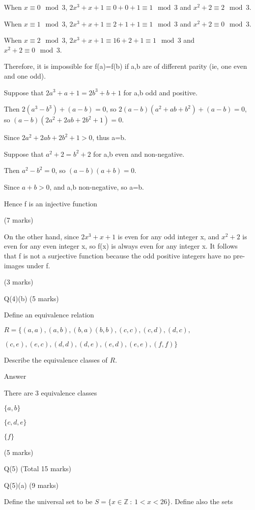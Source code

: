 \documentclass[a4paper,12pt,oneside]{book}
\theoremstyle{definition}
\begin{document}
When $x \equiv 0 \mod 3$, $2x^3 + x + 1 \equiv 0+0+1 \equiv 1 \mod 3$ and $x^2 + 2 \equiv 2 \mod 3$.

When $x \equiv 1 \mod 3$, $2x^3 + x + 1 \equiv 2+1+1 \equiv 1 \mod 3$ and $x^2 + 2 \equiv 0 \mod 3$.

When $x \equiv 2 \mod 3$, $2x^3 + x + 1 \equiv 16+2+1 \equiv 1 \mod 3$ and $x^2 + 2 \equiv 0 \mod 3$.

Therefore, it is impossible for f(a)=f(b) if a,b are of different parity (ie, one even and one odd).

Suppose that $2a^3 + a + 1 = 2b^3 + b + 1$ for a,b odd and positive. 

Then $2(a^3-b^3) + (a-b) = 0$, so $2(a-b)(a^2+ab+b^2) + (a-b) = 0$, so $(a-b)(2a^2+2ab+2b^2+1)=0$. 

Since $2a^2+2ab+2b^2+1 > 0$, thus a=b.

Suppose that $a^2 + 2 = b^2 + 2$ for a,b even and non-negative.

Then $a^2 - b^2 = 0$, so $(a-b)(a+b) = 0$.

Since $a+b > 0$, and a,b non-negative, so a=b.

Hence f is an injective function

(7 marks)

On the other hand, since $2x^3 + x + 1$ is even for any odd integer x, and $x^2+2$ is even for any even integer x, so f(x) is always even for any integer x. It follows that f is not a surjective function because the odd positive integers have no pre-images under f.

(3 marks)

Q(4)(b) (5 marks)

Define an equivalence relation 

$R = \{ (a,a), (a,b), (b,a) (b,b), (c,c), (c,d), (d,c), $

$(c,e), (e,c), (d,d), (d,e), (e,d), (e,e), (f,f) \}$

Describe the equivalence classes of $R$.

Answer

There are 3 equivalence classes

$\{a,b\}$

$\{c,d,e\}$

$\{ f \}$

(5 marks)

\newpage

Q(5) (Total 15 marks)

Q(5)(a) (9 marks)

Define the universal set to be $S = \{ x \in \mathbb{Z} \ : \ 1 < x < 26 \}$. Define also the sets
\end{document}
